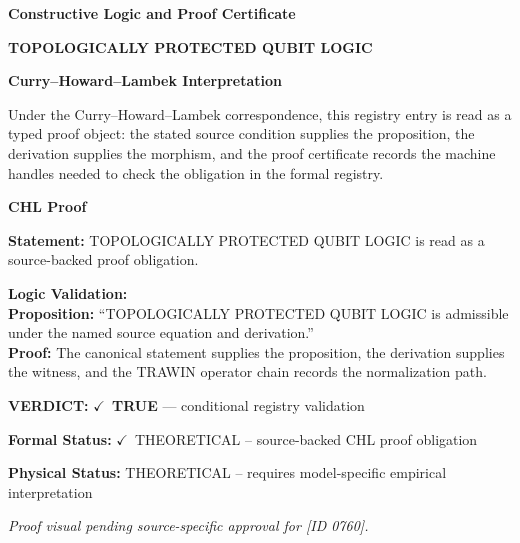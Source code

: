 \clearpage
\begingroup\tzpsupportsetup
\noindent\textbf{\fontsize{10.8pt}{12.8pt}\selectfont [ID 0760] Constructive Logic and Proof Certificate}\par
\noindent\textbf{\fontsize{10pt}{12pt}\selectfont TOPOLOGICALLY PROTECTED QUBIT LOGIC}\par
\vspace{0.45em}
\begingroup
\footnotesize
\setlength{\parskip}{0.22em}
\setlength{\parindent}{0pt}
\noindent\textbf{Curry--Howard--Lambek Interpretation}\par
Under the Curry--Howard--Lambek correspondence, this registry entry is read as a typed proof
object: the stated source condition supplies the proposition, the derivation supplies the
morphism, and the proof certificate records the machine handles needed to check the obligation
in the formal registry.

\vspace{0.45em}
\noindent\textbf{CHL Proof}\par
\textbf{Statement:} TOPOLOGICALLY PROTECTED QUBIT LOGIC is read as a source-backed proof obligation.

\textbf{Logic Validation:}\\
\textbf{Proposition:} ``TOPOLOGICALLY PROTECTED QUBIT LOGIC is admissible under the named source equation and derivation.''\\
\textbf{Proof:} The canonical statement supplies the proposition, the derivation supplies the witness, and the TRAWIN operator chain records the normalization path.

\textbf{VERDICT:} \ensuremath{\checkmark}\ \textbf{TRUE} --- conditional registry validation

\textbf{Formal Status:} \ensuremath{\checkmark}\ THEORETICAL -- source-backed CHL proof obligation

\textbf{Physical Status:} THEORETICAL -- requires model-specific empirical interpretation
\par\vspace{0.45em}
\par
\vfill
\begingroup\footnotesize\itshape
Proof visual pending source-specific approval for [ID 0760].
\par\endgroup
\vfill
\endgroup
\endgroup
